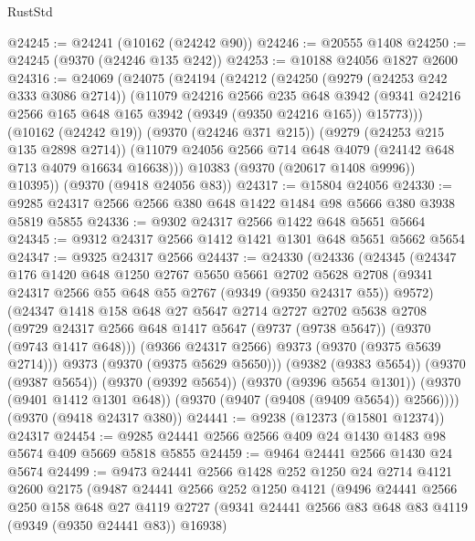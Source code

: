 \begin{lexlean}{RustStd}
\begin{coremodule}
@24245 := @24241 (@10162 (@24242 @90))
@24246 := @20555 @1408
@24250 := @24245 (@9370 (@24246 @135 @242))
@24253 := @10188 @24056 @1827 @2600
@24316 := @24069
    (@24075
      (@24194
        (@24212
          (@24250
            (@9279 (@24253 @242 @333 @3086 @2714))
            (@11079
              @24216
              @2566
              @235
              @648
              @3942
              (@9341 @24216 @2566 @165 @648 @165 @3942 (@9349 (@9350 @24216 @165)) @15773)))
          (@10162 (@24242 @19))
          (@9370 (@24246 @371 @215))
          (@9279 (@24253 @215 @135 @2898 @2714))
          (@11079 @24056 @2566 @714 @648 @4079 (@24142 @648 @713 @4079 @16634 @16638)))
        @10383
        (@9370 (@20617 @1408 @9996))
        @10395))
    (@9370 (@9418 @24056 @83))
@24317 := @15804 @24056
@24330 := @9285 @24317 @2566 @2566 @380 @648 @1422 @1484 @98 @5666 @380 @3938 @5819 @5855
@24336 := @9302 @24317 @2566 @1422 @648 @5651 @5664
@24345 := @9312 @24317 @2566 @1412 @1421 @1301 @648 @5651 @5662 @5654
@24347 := @9325 @24317 @2566
@24437 := @24330
    (@24336
      (@24345
        (@24347
          @176
          @1420
          @648
          @1250
          @2767
          @5650
          @5661
          @2702
          @5628
          @2708
          (@9341 @24317 @2566 @55 @648 @55 @2767 (@9349 (@9350 @24317 @55)) @9572)
          (@24347
            @1418
            @158
            @648
            @27
            @5647
            @2714
            @2727
            @2702
            @5638
            @2708
            (@9729 @24317 @2566 @648 @1417 @5647 (@9737 (@9738 @5647)) (@9370 (@9743 @1417 @648)))
            (@9366 @24317 @2566)
            @9373
            (@9370 (@9375 @5639 @2714)))
          @9373
          (@9370 (@9375 @5629 @5650)))
        (@9382 (@9383 @5654))
        (@9370 (@9387 @5654))
        (@9370 (@9392 @5654))
        (@9370 (@9396 @5654 @1301))
        (@9370 (@9401 @1412 @1301 @648))
        (@9370 (@9407 (@9408 (@9409 @5654)) @2566))))
    (@9370 (@9418 @24317 @380))
@24441 := @9238 (@12373 (@15801 @12374)) @24317
@24454 := @9285 @24441 @2566 @2566 @409 @24 @1430 @1483 @98 @5674 @409 @5669 @5818 @5855
@24459 := @9464 @24441 @2566 @1430 @24 @5674
@24499 := @9473
    @24441
    @2566
    @1428
    @252
    @1250
    @24
    @2714
    @4121
    @2600
    @2175
    (@9487
      @24441
      @2566
      @252
      @1250
      @4121
      (@9496
        @24441
        @2566
        @250
        @158
        @648
        @27
        @4119
        @2727
        (@9341 @24441 @2566 @83 @648 @83 @4119 (@9349 (@9350 @24441 @83)) @16938)

\end{coremodule}
\end{lexlean}
